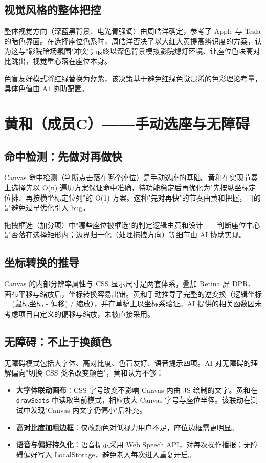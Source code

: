 \documentclass[12pt,a4paper]{ctexart}
\begin{document}
\subsection{视觉风格的整体把控}

整体视觉方向（深蓝黑背景、电光青强调）由周皓洋确定，参考了 Apple 与 Tesla 的暗色界面。在选择座位色系时，周皓洋否决了以大红大黄提高辨识度的方案，认为这与"影院暗场氛围"冲突；最终以深色背景模拟影院熄灯环境、让座位色块高对比跳出，视觉重心落在座位本身。

色盲友好模式将红绿替换为蓝紫，该决策基于避免红绿色觉混淆的色彩理论考量，具体色值由 AI 协助配置。

\section{黄和（成员C）——手动选座与无障碍}

\subsection{命中检测：先做对再做快}

Canvas 命中检测（判断点击落在哪个座位）是手动选座的基础。黄和在实现节奏上选择先以 O(n) 遍历方案保证命中准确，待功能稳定后再优化为"先按纵坐标定位排、再按横坐标定位列"的 O(1) 方案。这种"先对再快"的节奏由黄和把握，目的是避免过早优化引入 bug。

拖拽框选（加分项）中"哪些座位被框选"的判定逻辑由黄和设计——判断座位中心是否落在选择矩形内；边界归一化（处理拖拽方向）等细节由 AI 协助实现。

\subsection{坐标转换的推导}

Canvas 的内部分辨率属性与 CSS 显示尺寸是两套体系，叠加 Retina 屏 DPR、画布平移与缩放后，坐标转换容易出错。黄和手动推导了完整的逆变换（逻辑坐标 = (鼠标坐标 - 偏移) / 缩放），并在草稿上以坐标系验证。AI 提供的相关函数因未考虑项目自定义的偏移与缩放，未被直接采用。

\subsection{无障碍：不止于换颜色}

无障碍模式包括大字体、高对比度、色盲友好、语音提示四项。AI 对无障碍的理解偏向"切换 CSS 类名改变颜色"，黄和认为不够：

\begin{itemize}
  \item \textbf{大字体联动画布}：CSS 字号改变不影响 Canvas 内由 JS 绘制的文字。黄和在 \texttt{drawSeats} 中读取当前模式，相应放大 Canvas 字号与座位半径。该联动在测试中发现"Canvas 内文字仍偏小"后补充。
  \item \textbf{高对比度加粗边框}：仅改颜色对低视力用户不足，座位边框需更明显。
  \item \textbf{语音与偏好持久化}：语音提示采用 Web Speech API，对每次操作播报；无障碍偏好写入 LocalStorage，避免老人每次进入重复开启。
\end{itemize}
\end{document}
